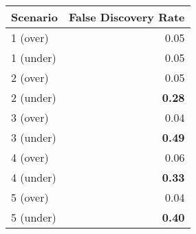 \begin{tabular}{lr}
  \hline
   Scenario & False Discovery Rate \\
  \hline
  1 (over) & 0.05 \\
  1 (under) & 0.05 \\
  2 (over) & 0.05 \\
  2 (under) & \textbf{0.28} \\
  3 (over) & 0.04 \\
  3 (under) & \textbf{0.49} \\
  4 (over) & 0.06 \\
  4 (under) & \textbf{0.33} \\
  5 (over) & 0.04 \\
  5 (under) & \textbf{0.40} \\
   \hline
\end{tabular}

